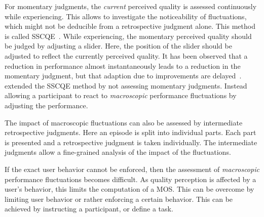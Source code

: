 For momentary judgments, the \emph{current} perceived quality is assessed continuously while experiencing.
This allows to investigate the noticeability of fluctuations, which might not be deducible from a retrospective judgment alone.
This method is called \ac{SSCQE}~\citep[][]{itu-r_recommendation_bt.500-13_methodology_2012}.
While experiencing, the momentary perceived quality should be judged by adjusting a slider.
Here, the position of the slider should be adjusted to reflect the currently perceived quality.
It has been observed that a reduction in performance almost instantaneously leads to a reduction in the momentary judgment, but that adaption due to improvements are delayed~\citep[\eg,][]{hands_recency_2001, gros_instantaneous_2001, hamberg_time-varying_1999}.
\citet{borowiak_long_2013} extended the \ac{SSCQE} method by not assessing momentary judgments.
Instead allowing a participant to react to \emph{macroscopic} performance fluctuations by adjusting the performance.

The impact of macroscopic fluctuations can also be assessed by intermediate retrospective judgments.
Here an episode is split into individual parts.
Each part is presented and a retrospective judgment is taken individually.
The intermediate judgments allow a fine-grained analysis of the impact of the fluctuations.

If the exact user behavior cannot be enforced, then the assessment of \emph{macroscopic} performance fluctuations becomes difficult.
As quality perception is affected by a user's behavior, this limits the computation of a \ac{MOS}. %
This can be overcome by limiting user behavior or rather enforcing a certain behavior.
This can be achieved by instructing a participant, or define a task.

